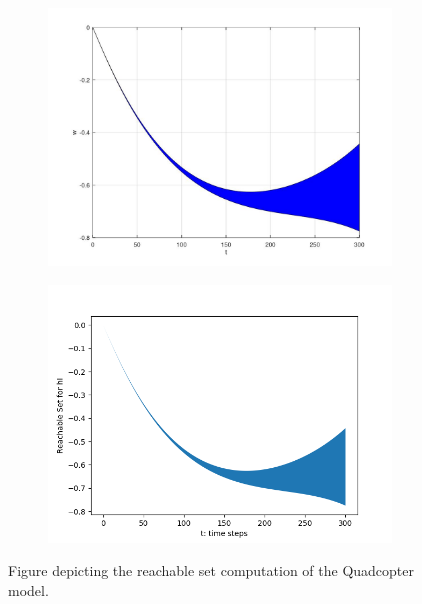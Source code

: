 \documentclass[EPiC]{easychair}
\begin{document}
\begin{figure}[h]
    \begin{subfigure}{0.5\textwidth}
    \centering
    \includegraphics[width=\textwidth]{SapoFigures/Quad/SapoQuad_HI.jpg}
    \end{subfigure}
    \begin{subfigure}{0.6\textwidth}
    \centering
    \includegraphics[width=\textwidth]{SapoFigures/Quad/KaaQuad_HI.png}
    \end{subfigure}
    
    \caption{Figure depicting the reachable set computation of the Quadcopter model.} 
    \label{fig3}
\end{figure}


\end{document}
